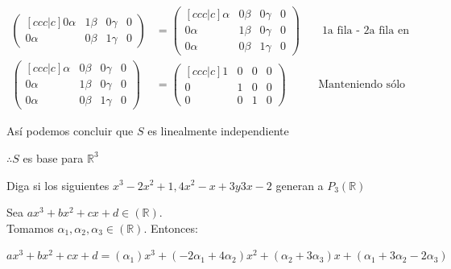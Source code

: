 \documentclass[letterpaper]{article}
\newcommand{\R}{\mathds{R}}
\renewcommand{\*}{\cdot}
\theoremstyle{definition}
\begin{document}
\begin{align*}
\begin{pmatrix}[ccc|c]
			 0\alpha & 1\beta & 0\gamma & 0\\
			 0\alpha & 0\beta & 1\gamma & 0
			 \end{pmatrix} & = \begin{pmatrix}[ccc|c]
			 \alpha & 0\beta & 0\gamma & 0\\
			 0\alpha & 1\beta & 0\gamma & 0\\
			 0\alpha & 0\beta & 1\gamma & 0
			 \end{pmatrix} && \text{ 1a fila - 2a fila en 1a fila}\\
			 \begin{pmatrix}[ccc|c]
			 \alpha & 0\beta & 0\gamma & 0\\
			 0\alpha & 1\beta & 0\gamma & 0\\
			 0\alpha & 0\beta & 1\gamma &0
			 \end{pmatrix} & = \begin{pmatrix}[ccc|c]
			 1 & 0 & 0 & 0\\
			 0 & 1 & 0 & 0\\
			 0 & 0 & 1 & 0
			 \end{pmatrix} &&  \text{Manteniendo sólo coeficientes}
		\end{align*}
		
		Así podemos concluir que $ S $ es linealmente independiente 
		\begin{center}
			$ \therefore S $ es base para $ \R^3 $
		\end{center}
\begin{ejercicio}{9}
	 Diga si los siguientes $x^3-2x^2+1,4x^2-x+3 y 3x-2$ generan a $P_{3}(\R)$
\end{ejercicio}

Sea $ax^3+bx^2+cx+d\in(\R)$.\\

Tomamos $\alpha_{1},\alpha_{2},\alpha_{3}\in (\R)$. Entonces:

$ax^3+bx^2+cx+d = (\alpha_{1})x^3 + (-2\alpha_{1}+4\alpha_{2})x^2 + (\alpha_{2}+3\alpha_{3})x + (\alpha_{1}+3\alpha_{2}-2\alpha_{3})$
\end{document}
